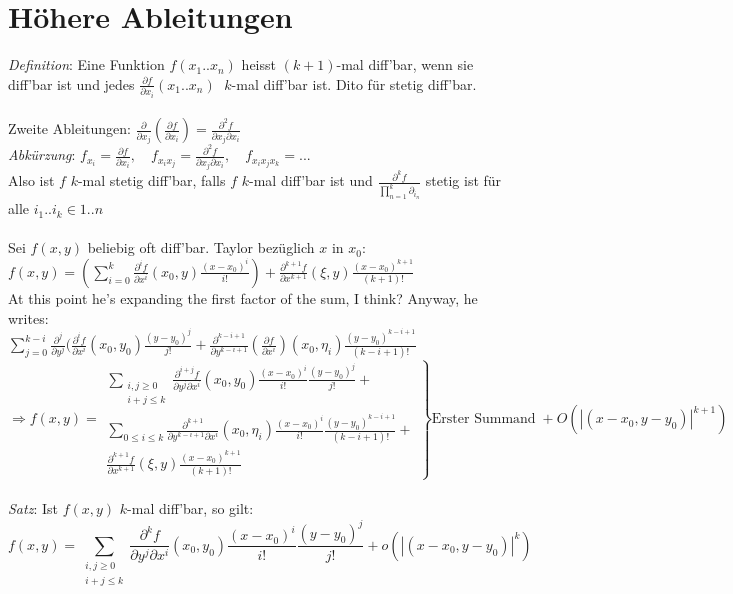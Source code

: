 \documentclass[12pt,a4paper,titlepage]{article}
\renewcommand{\d}{\partial}
\begin{document}
\section*{Höhere Ableitungen}
\textit{Definition}: Eine Funktion $f(x_1..x_n)$ heisst $(k+1)$-mal diff'bar, wenn sie diff'bar ist und jedes $\frac{\d f}{\d x_i}(x_1..x_n)\;$ $k$-mal diff'bar ist. Dito für stetig diff'bar. \\
\\
Zweite Ableitungen: $\frac{\d}{\d x_j}(\frac{\d f}{\d x_i})=\frac{\d^2 f}{\d x_j\d x_i}$ \\
\textit{Abkürzung}: $f_{x_i}=\frac{\d f}{\d x_i},\quad f_{x_ix_j}=\frac{\d^2 f}{\d x_j\d x_i},\quad f_{x_ix_jx_k}=...$ \\
Also ist $f$ $k$-mal stetig diff'bar, falls $f$ $k$-mal diff'bar ist und $\frac{\d^k f}{\prod_{n=1}^k\d_{i_n}}$ stetig ist für alle $i_1..i_k\in{1..n}$ \\
\\
Sei $f(x,y)$ beliebig oft diff'bar. Taylor bezüglich $x$ in $x_0$: \\
$f(x,y)=(\sum_{i=0}^k\frac{\d^if}{\d x^i}(x_0,y)\frac{(x-x_0)^i}{i!})+\frac{\d^{k+1}f}{\d x^{k+1}}(\xi,y)\frac{(x-x_0)^{k+1}}{(k+1)!}$ \\
At this point he's expanding the first factor of the sum, I think? Anyway, he writes: \\
$\sum_{j=0}^{k-i}\frac{\d^j}{\d y^j}(\frac{\d^if}{\d x^i}(x_0,y_0)\frac{(y-y_0)^j}{j!}+\frac{\d^{k-i+1}}{\d y^{k-i+1}}(\frac{\d f}{\d x^i})(x_0,\eta_i)\frac{(y-y_0)^{k-i+1}}{(k-i+1)!}$ \\
$\Rightarrow f(x,y)=\left.\begin{array}{l}
    \sum_{\substack{i,j\geq 0 \\ i+j\leq k}}\frac{\d^{i+j}f}{\d y^j\d x^i}(x_0,y_0)\frac{(x-x_0)^i}{i!}\frac{(y-y_0)^j}{j!} + \\
    \sum_{0\leq i\leq k}\frac{\d^{k+1}}{\d y^{k-i+1}\d x^i}(x_0,\eta_i)\frac{(x-x_0)^i}{i!}\frac{(y-y_0)^{k-i+1}}{(k-i+1)!} + \\
    \frac{\d^{k+1}f}{\d x^{k+1}}(\xi,y)\frac{(x-x_0)^{k+1}}{(k+1)!}
\end{array}\right\} \text{Erster Summand}\;+O(\left|(x-x_0,y-y_0)\right|^{k+1})$ \\
\\
\textit{Satz}: Ist $f(x,y)$ $k$-mal diff'bar, so gilt:
$$f(x,y)=\sum_{\substack{i,j\geq 0 \\ i+j\leq k}}\frac{\d^kf}{\d y^j\d x^i}(x_0,y_0)\frac{(x-x_0)^i}{i!}\frac{(y-y_0)^j}{j!}+o(\left|(x-x_0,y-y_0)\right|^k)$$ \\
\end{document}
